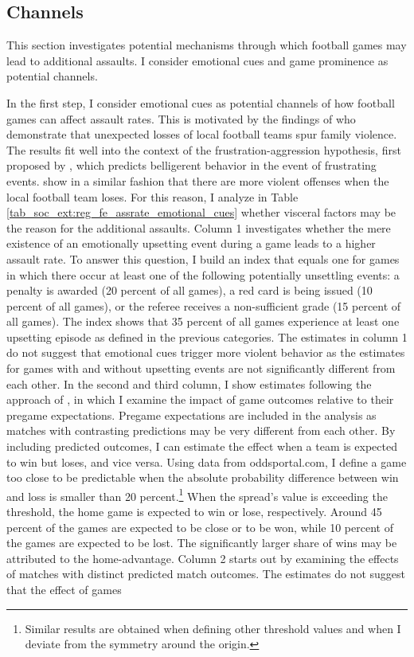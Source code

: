 \subsection{Channels}
This section investigates potential mechanisms through which football games may lead to additional assaults. I consider emotional cues and game prominence as potential channels.



In the first step, I consider emotional cues as potential channels of how football games can affect assault rates. This is motivated by the findings of \cite{card2011family} who demonstrate that unexpected losses of local football teams spur family violence. The results fit well into the context of the frustration-aggression hypothesis, first proposed by \cite{dollard1939frustration}, which predicts belligerent behavior in the event of frustrating events. \cite{rees2009college} show in a similar fashion that there are more violent offenses when the local football team loses. For this reason, I analyze in Table \ref{tab_soc_ext:reg_fe_assrate_emotional_cues} whether visceral factors may be the reason for the additional assaults. Column 1 investigates whether the mere existence of an emotionally upsetting event during a game leads to a higher assault rate. To answer this question, I build an index that equals one for games in which there occur at least one of the following potentially unsettling events: a penalty is awarded (20 percent of all games), a red card is being issued (10 percent of all games), or the referee receives a non-sufficient grade (15 percent of all games). The index shows that 35 percent of all games experience at least one upsetting episode as defined in the previous categories. The estimates in column 1 do not suggest that emotional cues trigger more violent behavior as the estimates for games with and without upsetting events are not significantly different from each other. 	In the second and third column, I show estimates following the approach of \cite{card2011family}, in which I examine the impact of game outcomes relative to their pregame expectations. Pregame expectations are included in the analysis as matches with contrasting predictions may be very different from each other. By including predicted outcomes, I can estimate the effect when a team is expected to win but loses, and vice versa. Using data from oddsportal.com, I define a game too close to be predictable when the absolute probability difference between win and loss is smaller than 20 percent.\footnote{Similar results are obtained when defining other threshold values and when I deviate from the symmetry around the origin.} When the spread's value is exceeding the threshold, the home game is expected to win or lose, respectively. Around 45 percent of the games are expected to be close or to be won, while 10 percent of the games are expected to be lost. The significantly larger share of wins may be attributed to the home-advantage. Column 2 starts out by examining the effects of matches with distinct predicted match outcomes. The estimates do not suggest that the effect of games 